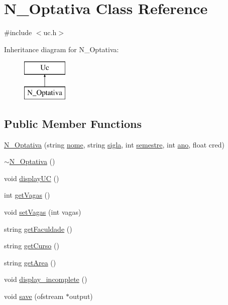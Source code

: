 \hypertarget{class_n___optativa}{}\section{N\+\_\+\+Optativa Class Reference}
\label{class_n___optativa}


{\ttfamily \#include $<$uc.\+h$>$}

Inheritance diagram for N\+\_\+\+Optativa\+:\begin{figure}[H]
\begin{center}
\leavevmode
\includegraphics[height=2.000000cm]{class_n___optativa}
\end{center}
\end{figure}
\subsection*{Public Member Functions}
\begin{DoxyCompactItemize}
\item 
\hyperlink{class_n___optativa_a9c0103c5330eaaebeb37a5236014345c}{N\+\_\+\+Optativa} (string \hyperlink{class_uc_af2971baa3ea283ba5fec29170de3fbe9}{nome}, string \hyperlink{class_uc_a5d6fb389c3634d6c4f4b92877e4e0e39}{sigla}, int \hyperlink{class_uc_a5e91075b035d68f536d35683c50c9bae}{semestre}, int \hyperlink{class_uc_aefaa6dc015733603451294d3e2efaa83}{ano}, float cred)
\item 
\hyperlink{class_n___optativa_a9cdbfb651fba33a1716e022c38e15d62}{$\sim$\+N\+\_\+\+Optativa} ()
\item 
void \hyperlink{class_n___optativa_a91df0bfdec2f9fd86ccf3f83d23dff4d}{display\+UC} ()
\item 
int \hyperlink{class_n___optativa_a8eb826eecb5447077d8906eb5a687193}{get\+Vagas} ()
\item 
void \hyperlink{class_n___optativa_a07d95cc8ffddb4e5b6109dceb4647d0c}{set\+Vagas} (int vagas)
\item 
string \hyperlink{class_n___optativa_a596634b068f013adb820683ff1f50566}{get\+Faculdade} ()
\item 
string \hyperlink{class_n___optativa_a94546c2209c4ff22d055084dc77477cd}{get\+Curso} ()
\item 
string \hyperlink{class_n___optativa_a43cdb1dcc1c9ec42dd29497c6b4b0dd0}{get\+Area} ()
\item 
void \hyperlink{class_n___optativa_a11190901ff62b2d09903e81886d4cdd4}{display\+\_\+incomplete} ()
\item 
void \hyperlink{class_n___optativa_aeb26db4a13ec5c11afa10b7e39bba66d}{save} (ofstream $\ast$output)
\end{DoxyCompactItemize}
